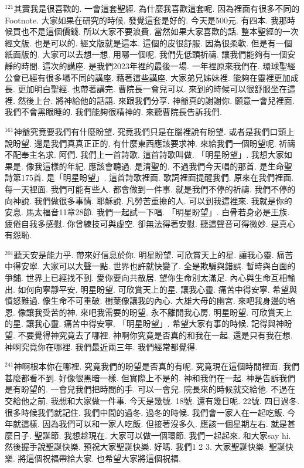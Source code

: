 \documentclass{book}
\begin{document}
$^{121}$其實我是很喜歡的.
一會這套聖經.
為什麼我喜歡這套呢.
因為裡面有很多不同的Footnote.
大家如果在研究的時候.
發覺這套是好的.
今天是500元.
有四本.
我那時候買也不是這個價錢.
所以大家不要浪費.
當然如果大家喜歡的話.
整本聖經的一次經文版.
也是可以的.
經文版就是這本.
這個的皮很舒服.
因為很柔軟.
但是有一個紙面版的.
大家可以去想一想.
用哪一個呢.
我們先低頭祈禱.
讓我們能夠有一個安靜的時間.
這次的講座.
是我們2023年裡的最後一場.
一年裡原來我們在.
環球聖經公會已經有很多場不同的講座.
藉著這些講座.
大家弟兄姊妹裡.
能夠在靈裡更加成長.
更加明白聖經.
也帶著講完.
曹院長一會兒可以.
來到的時候可以很舒服坐在這裡.
然後上台.
將神給他的話語.
來跟我們分享.
神爺真的謝謝你.
願意一會兒裡面.
我們不會黑眼睡的.
我們能夠很精神的.
來聽曹院長告訴我們.

$^{161}$神爺究竟要我們有什麼盼望.
究竟我們只是在腦裡說有盼望.
或者是我們口頭上說盼望.
還是我們真真正正的.
有什麼東西應該要求神.
來給我們一個盼望呢.
祈禱不配奉主名求.
阿們.
我們上一首詩歌.
這首詩歌叫做.
「明星盼望」.
我想大家如果是.
像我這樣的年紀.
應該會聽過.
是清聖的.
不過我們今天唱的那首.
是生命聖詩第175首.
是「明星盼望」.
這首詩歌裡面.
歌詞裡面提醒我們.
原來在我們裡面.
每一天裡面.
我們可能有些人.
都會做到一件事.
就是我們不停的祈禱.
我們不停的向神說.
我們做很多事情.
耶穌說.
凡勞苦重擔的人.
可以到我這裡來.
我就是你的安息.
馬太福音11章28節.
我們一起試一下唱.
「明星盼望」.
白骨若身必是王族.
疲倦自我多感慰.
你曾練技可與虛空.
卻無法得著安慰.
聽這聲音可得微妙.
是真心有怨恥.

$^{201}$聽天安是能力乎.
帶來好信息於你.
明星盼望.
可欣賞天上的星.
讓我心靈.
痛苦中得安寧.
大家可以大聲一點.
世界也許就快變了.
全是欺騙與錯誤.
暫時與白面的爭鋪.
世界上已經找不到.
愛你要向共散居.
望你生命別太滿足.
內心與生命互相輸出.
如何向寧靜平安.
明星盼望.
可欣賞天上的星.
讓我心靈.
痛苦中得安寧.
希望與憤怒難過.
像生命不可重破.
樹葉像讓我的內心.
大雄大母的幽宮.
來吧我身邊的培恩.
像讓我受苦的神.
來吧我需要的盼望.
永不離開我心房.
明星盼望.
可欣賞天上的星.
讓我心靈.
痛苦中得安寧.
「明星盼望」.
希望大家有事的時候.
記得與神盼望.
不要覺得神究竟去了哪裡.
神啊你究竟是否真的和我在一起.
還是只有我在想.
神啊究竟你在哪裡.
我們最近兩三年.
我們經常都覺得.

$^{241}$神啊根本你在哪裡.
究竟我們的盼望是否真的有呢.
究竟現在這個時間裡面.
我們甚麼都看不到.
好像很黑暗一樣.
但實際上不是的.
神和我們在一起.
神是告訴我們是有盼望的.
一會兒我們把時間的手.
可以一會兒.
院長來的時候就交給他.
不過在交給他之前.
我想和大家做一件事.
今天是幾號.
18號.
還有幾日呢.
22號.
四日過冬.
很多時候我們就記住.
我們中間的過冬.
過冬的時候.
我們會一家人在一起吃飯.
今年就這樣.
因為我們可以和一家人吃飯.
但接著沒多久.
應該一個星期左右.
就是甚麼日子.
聖誕節.
我想趁現在.
大家可以做一個環節.
我們一起起來.
和大家say hi.
然後握手說聖誕快樂.
預祝大家聖誕快樂.
好嗎.
我們1 2 3.
大家聖誕快樂.
聖誕快樂.
將這個祝福帶給大家.
也希望大家將這個祝福.
\end{document}
